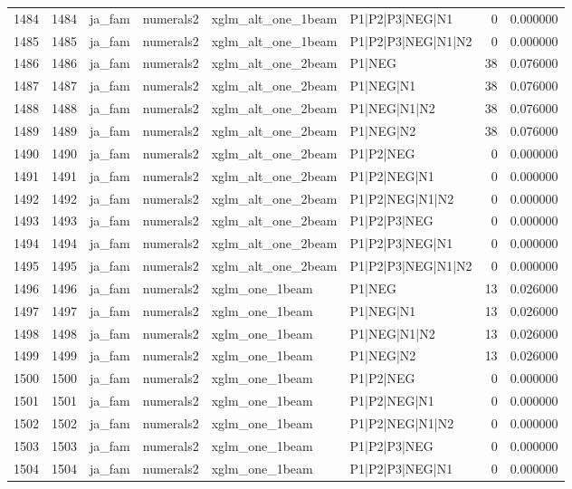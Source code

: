 \begin{tabular}{lrllllrr}
1484 & 1484 & ja_fam & numerals2 & xglm_alt_one_1beam & P1|P2|P3|NEG|N1 & 0 & 0.000000 \\
1485 & 1485 & ja_fam & numerals2 & xglm_alt_one_1beam & P1|P2|P3|NEG|N1|N2 & 0 & 0.000000 \\
1486 & 1486 & ja_fam & numerals2 & xglm_alt_one_2beam & P1|NEG & 38 & 0.076000 \\
1487 & 1487 & ja_fam & numerals2 & xglm_alt_one_2beam & P1|NEG|N1 & 38 & 0.076000 \\
1488 & 1488 & ja_fam & numerals2 & xglm_alt_one_2beam & P1|NEG|N1|N2 & 38 & 0.076000 \\
1489 & 1489 & ja_fam & numerals2 & xglm_alt_one_2beam & P1|NEG|N2 & 38 & 0.076000 \\
1490 & 1490 & ja_fam & numerals2 & xglm_alt_one_2beam & P1|P2|NEG & 0 & 0.000000 \\
1491 & 1491 & ja_fam & numerals2 & xglm_alt_one_2beam & P1|P2|NEG|N1 & 0 & 0.000000 \\
1492 & 1492 & ja_fam & numerals2 & xglm_alt_one_2beam & P1|P2|NEG|N1|N2 & 0 & 0.000000 \\
1493 & 1493 & ja_fam & numerals2 & xglm_alt_one_2beam & P1|P2|P3|NEG & 0 & 0.000000 \\
1494 & 1494 & ja_fam & numerals2 & xglm_alt_one_2beam & P1|P2|P3|NEG|N1 & 0 & 0.000000 \\
1495 & 1495 & ja_fam & numerals2 & xglm_alt_one_2beam & P1|P2|P3|NEG|N1|N2 & 0 & 0.000000 \\
1496 & 1496 & ja_fam & numerals2 & xglm_one_1beam & P1|NEG & 13 & 0.026000 \\
1497 & 1497 & ja_fam & numerals2 & xglm_one_1beam & P1|NEG|N1 & 13 & 0.026000 \\
1498 & 1498 & ja_fam & numerals2 & xglm_one_1beam & P1|NEG|N1|N2 & 13 & 0.026000 \\
1499 & 1499 & ja_fam & numerals2 & xglm_one_1beam & P1|NEG|N2 & 13 & 0.026000 \\
1500 & 1500 & ja_fam & numerals2 & xglm_one_1beam & P1|P2|NEG & 0 & 0.000000 \\
1501 & 1501 & ja_fam & numerals2 & xglm_one_1beam & P1|P2|NEG|N1 & 0 & 0.000000 \\
1502 & 1502 & ja_fam & numerals2 & xglm_one_1beam & P1|P2|NEG|N1|N2 & 0 & 0.000000 \\
1503 & 1503 & ja_fam & numerals2 & xglm_one_1beam & P1|P2|P3|NEG & 0 & 0.000000 \\
1504 & 1504 & ja_fam & numerals2 & xglm_one_1beam & P1|P2|P3|NEG|N1 & 0 & 0.000000 \\

\end{tabular}
